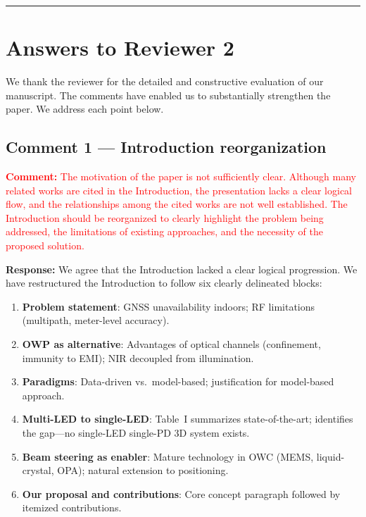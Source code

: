 \documentclass[11pt]{article}
\newcommand{\reviewercomment}[1]{\noindent\textcolor{red}{\textbf{Comment:} #1}\par\vspace{6pt}}
\newcommand{\response}{\noindent\textbf{Response:} }
\begin{document}
\vspace{12pt}
\hrule
\vspace{12pt}

\section{Answers to Reviewer 2}

\vspace{6pt}

\noindent We thank the reviewer for the detailed and constructive evaluation of our manuscript. The comments have enabled us to substantially strengthen the paper. We address each point below.

\vspace{12pt}

\subsection{Comment 1 --- Introduction reorganization}

\reviewercomment{The motivation of the paper is not sufficiently clear. Although many related works are cited in the Introduction, the presentation lacks a clear logical flow, and the relationships among the cited works are not well established. The Introduction should be reorganized to clearly highlight the problem being addressed, the limitations of existing approaches, and the necessity of the proposed solution.}

\response We agree that the Introduction lacked a clear logical progression. We have restructured the Introduction to follow six clearly delineated blocks:

\begin{enumerate}[leftmargin=*]
    \item \textbf{Problem statement}: GNSS unavailability indoors; RF limitations (multipath, meter-level accuracy).
    \item \textbf{OWP as alternative}: Advantages of optical channels (confinement, immunity to EMI); NIR decoupled from illumination.
    \item \textbf{Paradigms}: Data-driven vs.\ model-based; justification for model-based approach.
    \item \textbf{Multi-LED to single-LED}: Table~I summarizes state-of-the-art; identifies the gap---no single-LED single-PD 3D system exists.
    \item \textbf{Beam steering as enabler}: Mature technology in OWC (MEMS, liquid-crystal, OPA); natural extension to positioning.
    \item \textbf{Our proposal and contributions}: Core concept paragraph followed by itemized contributions.
\end{enumerate}
\end{document}
